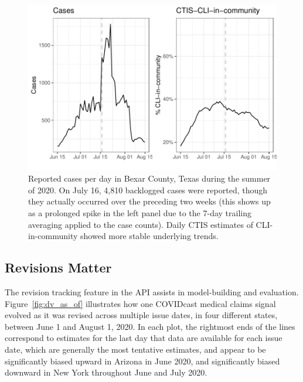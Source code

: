 \documentclass[9pt,twocolumn,twoside,lineno]{pnas-new}
\begin{document}
\begin{figure}[t]
  \includegraphics[width=\columnwidth]{fig/bexar_compare.pdf}
  \caption{Reported cases per day in Bexar County, Texas during the summer of
    2020. On July 16, 4,810 backlogged cases were reported, though they actually
    occurred over the preceding two weeks (this shows up as a prolonged spike in
    the left panel due to the 7-day trailing averaging applied to the case
    counts). Daily CTIS estimates of CLI-in-community showed more stable
    underlying trends.}
  \label{fig:bexar_compare}
\end{figure}

\subsection{Revisions Matter}

The revision tracking feature in the API assists in model-building and
evaluation. Figure~\ref{fig:dv_as_of} illustrates how one COVIDcast medical
claims signal evolved as it was revised across multiple issue dates, in four
different states, between June 1 and August 1, 2020. In each plot, the rightmost
ends of the lines correspond to estimates for the last day that data are
available for each issue date, which are generally the most tentative estimates,
and appear to be significantly biased upward in Arizona in June 2020, and
significantly biased downward in New York throughout June and July 2020.
\end{document}

